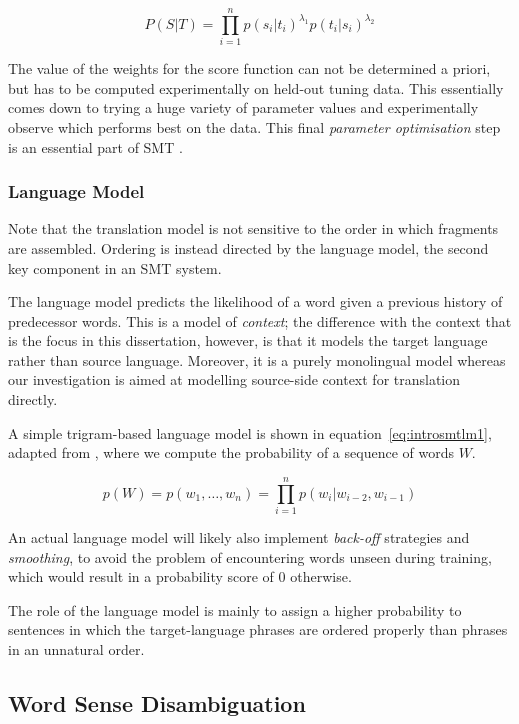 \begin{equation}
P(S|T) = \prod_{i=1}^{n} p(s_i|t_i)^{\lambda_1} p(t_i|s_i)^{\lambda_2}
\label{eq:introsmt3}
\end{equation}

The value of the weights for the score function can not be determined a priori,
but has to be computed experimentally on held-out tuning data. This essentially
comes down to trying a huge variety of parameter values and experimentally
observe which performs best on the data.  This final \emph{parameter
optimisation} step is an essential part of SMT \citep{MERT}.

\subsubsection{Language Model}

Note that the translation model is not sensitive to the order in which
fragments are assembled. Ordering is instead directed by the language model,
the second key component in an SMT system.

The language model predicts the likelihood of a word given a previous history
of predecessor words. This is a model of \emph{context}; the difference with
the context that is the focus in this dissertation, however, is that it models
the target language rather than source language. Moreover, it is a purely
monolingual model whereas our investigation is aimed at modelling source-side
context for translation directly.

A simple trigram-based language model is shown in equation~\ref{eq:introsmtlm1}, adapted from
\cite{Cole1997}, where we compute the probability of a sequence of words $W$.

\begin{equation}
p(W) = p(w_1,\ldots,w_n) = \prod_{i=1}^{n} p(w_i|w_{i-2},w_{i-1})
\label{eq:introsmtlm1}
\end{equation}

An actual language model will likely also implement \emph{back-off} strategies and
\emph{smoothing}, to avoid the problem of encountering words unseen during
training, which would result in a probability score of $0$ otherwise. 

The role of the language model is mainly to assign a higher probability to
sentences in which the target-language phrases are ordered properly than
phrases in an unnatural order. 

\subsection{Word Sense Disambiguation}


